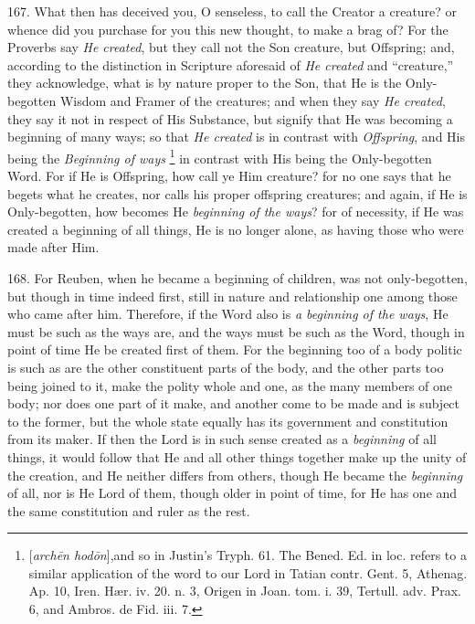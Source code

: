 167. What then has deceived
you, O senseless, to call the Creator a creature? or whence did you
purchase for you this new thought, to make a brag of? For the Proverbs
say \emph{He created}, but they call not the Son creature, but
Offspring; and, according to the distinction in Scripture aforesaid of
\emph{He created} and ``creature,'' they acknowledge, what is by nature
proper to the Son, that He is the Only-begotten Wisdom and Framer of
the creatures; and when they say \emph{He created}, they say it not in
respect of His Substance, but signify that He was becoming a beginning
of many ways; so that \emph{He created} is in contrast with \emph{Offspring},
and His being the \emph{Beginning of ways} \footnote{[\emph{arch\={e}n hod\={o}n}],\emph{}and so in Justin's Tryph.
61. The Bened. Ed. in loc. refers to a similar application of the word
to our Lord in Tatian contr. Gent. 5, Athenag. Ap. 10, Iren. Hær. iv.
20. n. 3, Origen in Joan. tom. i. 39, Tertull. adv. Prax. 6, and
Ambros. de Fid. iii. 7.} in contrast with His being the Only-begotten Word. For if He
is Offspring, how call ye Him creature? for no one says that he begets
what he creates, nor calls his proper offspring creatures; and again,
if He is Only-begotten, how becomes He \emph{beginning of the ways}?
for of necessity, if He was created a beginning of all things,
He is no longer alone, as having those who were made after Him.

168. For Reuben, when he
became a beginning of children, was not only-begotten, but though in
time indeed first, still in nature and relationship one among those
who came after him. Therefore, if the Word also is \emph{a beginning of
the ways}, He must be such as the ways are, and the ways must be
such as the Word, though in point of time He be created first of them.
For the beginning too of a body politic is such as are the other
constituent parts of the body, and the other parts too being joined to
it, make the polity whole and one, as the many members of one body;
nor does one part of it make, and another come to be made and is
subject to the former, but the whole state equally has its government
and constitution from its maker. If then the Lord is in such sense
created as a \emph{beginning} of all things, it would follow that He
and all other things together make up the unity of the creation, and
He neither differs from others, though He became the \emph{beginning}
of all, nor is He Lord of them, though older in point of time, for He
has one and the same constitution and ruler as the rest.

